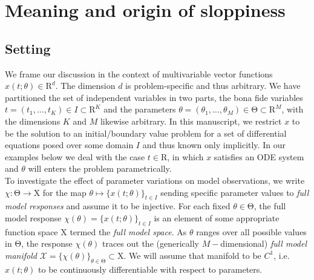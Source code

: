 \documentclass{article}
\newcommand{\p}{\theta}
\newcommand{\fmr}{\chi}
\newcommand{\fmm}{\mathcal{X}}
\newcommand{\R}{\mathrm{R}}
\newcommand{\ps}{\mathrm{\Theta}}
\newcommand{\fms}{\mathrm{X}}
\begin{document}
\section{Meaning and origin of sloppiness}

\subsection{Setting}
%
We frame our discussion in the context of multivariable vector functions $x(t;\p) \in \R^d$.
The dimension $d$ is problem-specific and thus arbitrary.
We have partitioned the set of independent variables in two parts, the bona fide variables $t = (t_1,\ldots,t_K) \in I \subset \R^K$ and the parameters $\p = (\p_1,\ldots,\p_M) \in \ps \subset \R^M$, with the dimensions $K$ and $M$ likewise arbitrary.
In this manuscript, we restrict $x$ to be the solution to an initial/boundary value problem for a set of differential equations posed over some domain $I$ and thus known only implicitly.
In our examples below we deal with the case $t\in\R$, in which $x$ satisfies an ODE system and $\p$ will enters the problem parametrically.\\

To investigate the effect of parameter variations on model observations, we write $\fmr : \ps \to \fms$ for the map $\p \mapsto \{ x(t;\p) \}_{t \in I}$ sending specific parameter values to \emph{full model responses} and assume it to be injective.
For each fixed $\p\in\ps$, the full model response $\fmr(\p) = \{x(t;\p) \}_{t \in I}$ is an element of some appropriate function space $\fms$ termed the \emph{full model space}.
As $\p$ ranges over all possible values in $\ps$, the response $\fmr(\p)$ traces out the (generically $M-$dimensional) \emph{full model manifold} $\fmm =
\{ \fmr(\p) \}_{\p \in \ps}
\subset
\fms$.
We will assume that manifold to be $C^1$, i.e. $x(t;\p)$ to be continuously differentiable with respect to parameters.\\
\end{document}
